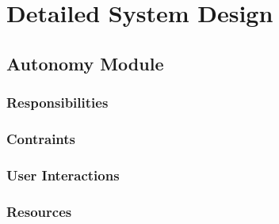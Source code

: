 \section{Detailed System Design}
\label{sec:detailed}

\subsection{Autonomy Module}
\label{sec:autonomy_design}

\subsubsection{Responsibilities}
\label{sec:responsibilities}

\subsubsection{Contraints}
\label{sec:constraints}

\subsubsection{User Interactions}
\label{sec:interactions}

\subsubsection{Resources}
\label{sec:resources}

